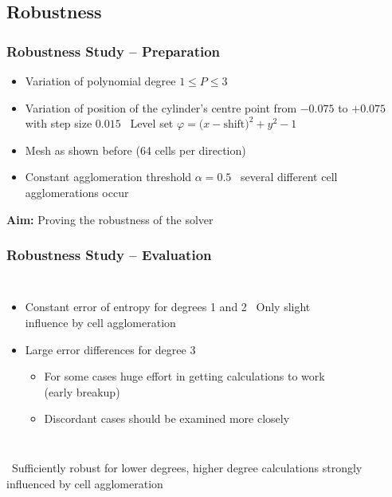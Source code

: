 	\subsection{Robustness}
	\begin{frame}
		\frametitle{Robustness Study -- Preparation}
		\begin{itemize}
			\item Variation of polynomial degree $ 1 \leq P \leq 3$
			\item Variation of position of the cylinder's centre point from $-0.075$ to $+0.075$ with step size $0.015$ \newline \MVRightArrow \, Level set $\varphi  = (x-\text{shift)}^2 + y^2 -1$
			\item Mesh as shown before (64 cells per direction)
			\item Constant agglomeration threshold $\alpha = 0.5$  \newline \MVRightArrow \, several different cell agglomerations occur			
		\end{itemize}
		\vspace{0.5cm}
		\begin{center}
			\large
			\textbf{Aim:} Proving the robustness of the solver
		\end{center}
	\end{frame}
	\begin{frame}
		\frametitle{Robustness Study -- Evaluation}
		\begin{columns}[t]
	\column[]{6cm}
		\vspace{-0.5cm}
	\begin{itemize}
		\item Constant error of entropy for degrees 1 and 2 \newline \MVRightarrow \, Only slight influence by cell agglomeration
		\item Large error differences for degree 3
		\begin{itemize}
			\item For some cases huge effort in getting calculations to work (early breakup)
			\item Discordant cases should be examined more closely
		\end{itemize}
	\end{itemize}
	\column[]{6cm}
			\begin{figure}[htp]	
				\vspace{-1cm}
				\centering
				
			\end{figure}
		\end{columns}
	\begin{center}
		\large
		\MVRightarrow \, Sufficiently robust for lower degrees, higher degree calculations strongly influenced by cell agglomeration
	\end{center}
	\end{frame}
